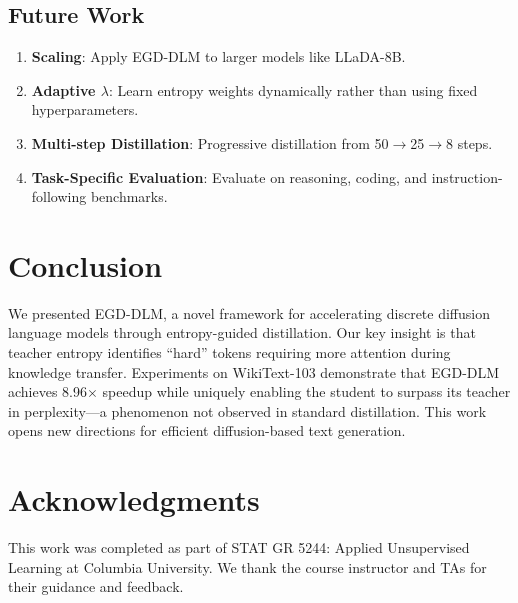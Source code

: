 \documentclass[conference]{IEEEtran}
\begin{document}
\subsection{Future Work}

\begin{enumerate}
    \item \textbf{Scaling}: Apply EGD-DLM to larger models like LLaDA-8B.
    \item \textbf{Adaptive $\lambda$}: Learn entropy weights dynamically rather than using fixed hyperparameters.
    \item \textbf{Multi-step Distillation}: Progressive distillation from 50$\rightarrow$25$\rightarrow$8 steps.
    \item \textbf{Task-Specific Evaluation}: Evaluate on reasoning, coding, and instruction-following benchmarks.
\end{enumerate}

\section{Conclusion}
\label{sec:conclusion}

We presented EGD-DLM, a novel framework for accelerating discrete diffusion language models through entropy-guided distillation. Our key insight is that teacher entropy identifies ``hard'' tokens requiring more attention during knowledge transfer. Experiments on WikiText-103 demonstrate that EGD-DLM achieves 8.96$\times$ speedup while uniquely enabling the student to surpass its teacher in perplexity---a phenomenon not observed in standard distillation. This work opens new directions for efficient diffusion-based text generation.

\section*{Acknowledgments}

This work was completed as part of STAT GR 5244: Applied Unsupervised Learning at Columbia University. We thank the course instructor and TAs for their guidance and feedback.

\newpage
\appendix
\end{document}
